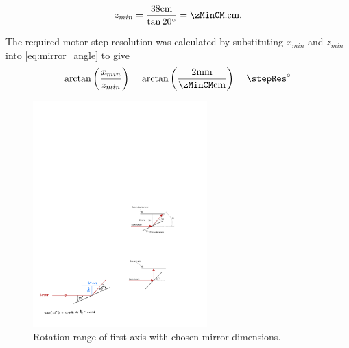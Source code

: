 \begin{equation}
    z_{min} = \frac{\enclosureHeightCM \text{cm}}{\tan{20\degree}} = \zMinCM. \text{cm}.
    \label{eq:z_min_calculation}
\end{equation}

The required motor step resolution was calculated by substituting $x_{min}$ and $z_{min}$ into \autoref{eq:mirror_angle} to give
\begin{equation}
    \arctan\left({\frac{x_{min}}{z_{min}}}\right) = \arctan\left({\frac{\requiredLatStepSizeMM \text{mm}}{\zMinCM \text{cm}}}\right) = \stepRes\degree
    \label{eq:step_resolution_calculation}
\end{equation}

\begin{figure}[h]
    \centering
    \includegraphics[width=0.6\textwidth]{figures/rotation_range_of_first_axis.pdf}
    \caption{Rotation range of first axis with chosen mirror dimensions.}
    \label{fig:turret_motion_range}
\end{figure}


